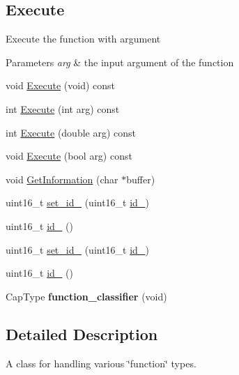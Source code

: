 \subsection*{Execute}
\label{_amgrp40cd014b7b6251e3a22e6a45a73a64e1}%
Execute the function with argument 
\begin{DoxyParams}{Parameters}
{\em arg} & the input argument of the function \\
\hline
\end{DoxyParams}
\begin{DoxyCompactItemize}
\item 
void \hyperlink{classCapitalFunction_a186d9595b28182ab66a6dc852e886b51}{Execute} (void) const 
\item 
int \hyperlink{classCapitalFunction_ab2e4ab2da79f3a1ddd35a03d83b01940}{Execute} (int arg) const 
\item 
int \hyperlink{classCapitalFunction_acec9c2031c60781057076a75038c506b}{Execute} (double arg) const 
\item 
void \hyperlink{classCapitalFunction_a87f340ed78a0a302aac69252987a7eb6}{Execute} (bool arg) const 
\item 
void \hyperlink{classCapitalFunction_ac8c2cc35ea735b4197cf080828b708d3}{Get\-Information} (char $\ast$buffer)
\item 
uint16\-\_\-t \hyperlink{classCapitalFunction_aed6d3adf21ec01f78ef7fbc78b7db072}{set\-\_\-id\-\_} (uint16\-\_\-t \hyperlink{classCapitalFunction_a15bb55ddfec1ad1c3c21fe1493e00f33}{id\-\_})
\item 
uint16\-\_\-t \hyperlink{classCapitalFunction_a15bb55ddfec1ad1c3c21fe1493e00f33}{id\-\_} ()
\item 
uint16\-\_\-t \hyperlink{classCapitalFunction_a645a79adaa1676f7bc7f7be4033d87ae}{set\-\_\-id\-\_} (uint16\-\_\-t \hyperlink{classCapitalFunction_a7eef4dc83c5fc8529ceb30372316af55}{id\-\_})
\item 
uint16\-\_\-t \hyperlink{classCapitalFunction_a7eef4dc83c5fc8529ceb30372316af55}{id\-\_} ()
\item 
\hypertarget{classCapitalFunction_a5fb54b80f92a1620d1e3b2f74a7b260e}{Cap\-Type {\bfseries function\-\_\-classifier} (void)}\label{classCapitalFunction_a5fb54b80f92a1620d1e3b2f74a7b260e}

\end{DoxyCompactItemize}


\subsection{Detailed Description}
A class for handling various \char`\"{}function\char`\"{} types. 


